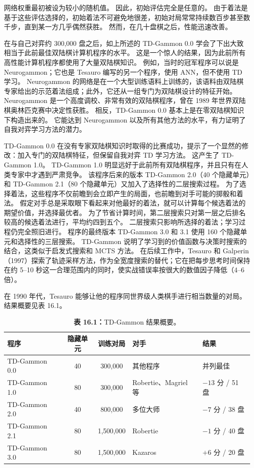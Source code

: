 \documentclass[UTF8, 12pt, fontset=fandol, oneside]{ctexart}
\begin{document}
网络权重最初被设为较小的随机值。
因此，初始评估完全是任意的。
由于着法是基于这些评估选择的，初始着法不可避免地很差，初始对局常常持续数百步甚至数千步，直到某一方几乎偶然获胜。
然而，在几十盘棋之后，性能迅速改善。

在与自己对弈约 300,000 盘之后，如上所述的 TD-Gammon 0.0 学会了下出大致相当于此前最佳双陆棋计算机程序的水平。
这是一个惊人的结果，因为此前所有高性能计算机程序都使用了大量双陆棋知识。
例如，当时的冠军程序可以说是 Neurogammon；它也是 Tesauro 编写的另一个程序，使用 ANN，但不使用 TD 学习。
Neurogammon 的网络是在一个大型训练语料上训练的，该语料由双陆棋专家给出的示范着法组成；此外，它还从一组专门为双陆棋设计的特征开始。
Neurogammon 是一个高度调校、非常有效的双陆棋程序，曾在 1989 年世界双陆棋奥林匹克赛中决定性获胜。
相反，TD-Gammon 0.0 基本上是在零双陆棋知识下构造出来的。
它能达到 Neurogammon 以及所有其他方法的水平，有力证明了自我对弈学习方法的潜力。

TD-Gammon 0.0 在没有专家双陆棋知识时取得的比赛成功，提示了一个显然的修改：加入专门的双陆棋特征，但保留自我对弈 TD 学习方法。
这产生了 TD-Gammon 1.0。
TD-Gammon 1.0 明显远好于此前所有双陆棋程序，并且只有在人类专家中才遇到严肃竞争。
该程序后来的版本 TD-Gammon 2.0（40 个隐藏单元）和 TD-Gammon 2.1（80 个隐藏单元）又加入了选择性的二层搜索过程。
为了选择着法，这些程序不仅前瞻到会立即产生的局面，也前瞻到对手可能的掷骰和着法。
假定对手总是采取眼下看起来对他最好的着法，就可以计算每个候选着法的期望价值，并选择最优者。
为了节省计算时间，第二层搜索只对第一层之后排名较高的候选着法进行，平均约四到五个。
二层搜索只影响所选择的着法；学习过程仍完全照旧进行。
程序的最终版本 TD-Gammon 3.0 和 3.1 使用 160 个隐藏单元和选择性的三层搜索。
TD-Gammon 说明了学习到的价值函数与决策时搜索的结合，这类似于启发式搜索和 MCTS 方法。
在后续工作中，Tesauro 和 Galperin（1997）探索了轨迹采样方法，作为全宽度搜索的替代；它在把每步思考时间保持在约 5--10 秒这一合理范围内的同时，使实战错误率按很大的数值因子降低（4--6 倍）。

在 1990 年代，Tesauro 能够让他的程序同世界级人类棋手进行相当数量的对局。
结果概要见表 16.1。

\begin{table}[htbp]
\centering
\caption*{\textbf{表 16.1：}TD-Gammon 结果概要。}
\begin{tabular}{l c c l l}
\toprule
程序 & 隐藏单元 & 训练对局 & 对手 & 结果 \\
\midrule
TD-Gammon 0.0 & 40 & 300,000 & 其他程序 & 并列最佳 \\
TD-Gammon 1.0 & 80 & 300,000 & Robertie、Magriel 等 & $-13$ 分 / 51 盘 \\
TD-Gammon 2.0 & 40 & 800,000 & 多位大师 & $-7$ 分 / 38 盘 \\
TD-Gammon 2.1 & 80 & 1,500,000 & Robertie & $-1$ 分 / 40 盘 \\
TD-Gammon 3.0 & 80 & 1,500,000 & Kazaros & $+6$ 分 / 20 盘 \\
\bottomrule
\end{tabular}
\end{table}
\end{document}

